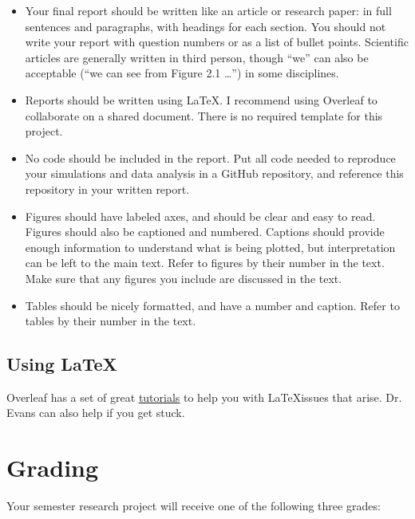 \documentclass[11pt]{article}
\begin{document}
\begin{itemize}
\item Your final report should be written like an article or research paper: in full sentences and paragraphs, with headings for each section. You should not write your report with question numbers or as a list of bullet points. Scientific articles are generally written in third person, though “we” can also be acceptable (“we can see from Figure 2.1 …”) in some disciplines.

\item Reports should be written using \LaTeX. I recommend using Overleaf to collaborate on a shared document. There is no required template for this project.

\item No code should be included in the report. Put all code needed to reproduce your simulations and data analysis in a GitHub repository, and reference this repository in your written report.

\item Figures should have labeled axes, and should be clear and easy to read. Figures should also be captioned and numbered. Captions should provide enough information to understand what is being plotted, but interpretation can be left to the main text. Refer to figures by their number in the text. Make sure that any figures you include are discussed in the text.

\item Tables should be nicely formatted, and have a number and caption. Refer to tables by their number in the text.
\end{itemize}

\subsection*{Using LaTeX}

Overleaf has a set of great \href{https://www.overleaf.com/learn/latex/Tutorials}{\underline{tutorials}} to help you with \LaTeX issues that arise. Dr. Evans can also help if you get stuck.

\vspace{0.5cm}

\section*{Grading}

Your semester research project will receive one of the following three grades:
\end{document}
